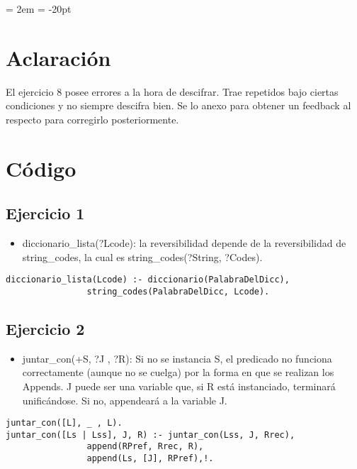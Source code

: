 \documentclass[spanish, 10pt,a4paper]{article}
\numberwithin{equation}{section} %
\begin{document}
{ \oddsidemargin = 2em
	\headheight = -20pt
	\maketitle
}
	\tableofcontents
	\newpage

\section{Aclaración}
El ejercicio 8 posee errores a la hora de descifrar. Trae repetidos bajo ciertas condiciones y no siempre descifra bien. Se lo anexo para obtener un feedback al respecto para corregirlo posteriormente.

\section{Código}

\subsection{Ejercicio 1}

\begin{itemize}
\item diccionario\_lista(?Lcode): la reversibilidad depende de la reversibilidad de string\_codes, la cual es string\_codes(?String, ?Codes).
\end{itemize}
\begin{lstlisting}
diccionario_lista(Lcode) :- diccionario(PalabraDelDicc), 
			    string_codes(PalabraDelDicc, Lcode). 
\end{lstlisting}

\subsection{Ejercicio 2}

\begin{itemize}
\item juntar\_con(+S, ?J , ?R): Si no se instancia S, el predicado no funciona correctamente (aunque no se cuelga) por la forma en que se realizan los Appends. 
J puede ser una variable que, si R está instanciado, terminará unificándose. Si no, appendeará a la variable J.
\end{itemize}
\begin{lstlisting}
juntar_con([L], _ , L).
juntar_con([Ls | Lss], J, R) :- juntar_con(Lss, J, Rrec), 
				append(RPref, Rrec, R), 
				append(Ls, [J], RPref),!.  
\end{lstlisting}
\end{document}
